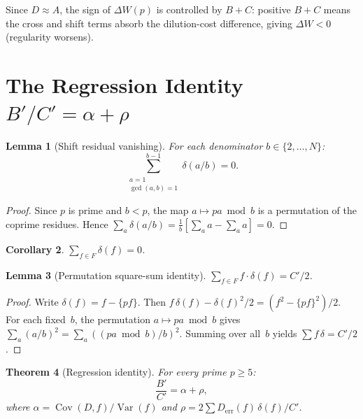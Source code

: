 \documentclass[11pt]{article}
\newtheorem{theorem}{Theorem}[section]
\newtheorem{lemma}[theorem]{Lemma}
\newtheorem{corollary}[theorem]{Corollary}
\theoremstyle{definition}
\DeclareMathOperator{\Cov}{Cov}
\DeclareMathOperator{\Var}{Var}
\begin{document}
Since $D \approx A$, the sign of $\Delta W(p)$ is controlled by
$B + C$: positive $B + C$ means the cross and shift terms absorb
the dilution-cost difference, giving $\Delta W < 0$ (regularity
worsens).



\section{The Regression Identity $B'/C' = \alpha + \rho$}
\label{sec:regression}

\begin{lemma}[Shift residual vanishing]\label{lem:shift-vanish}
For each denominator $b \in \{2, \ldots, N\}$:
\[
  \sum_{\substack{a=1 \\ \gcd(a,b)=1}}^{b-1} \delta(a/b) = 0.
\]
\end{lemma}

\begin{proof}
Since $p$ is prime and $b < p$, the map $a \mapsto pa \bmod b$ is a
permutation of the coprime residues.  Hence
$\sum_a \delta(a/b) = \frac{1}{b}[\sum_a a - \sum_a a] = 0$.
\end{proof}

\begin{corollary}\label{cor:sum-delta-zero}
$\sum_{f \in F} \delta(f) = 0$.
\end{corollary}

\begin{lemma}[Permutation square-sum identity]\label{lem:perm-sq}
$\sum_{f \in F} f \cdot \delta(f) = C'/2$.
\end{lemma}

\begin{proof}
Write $\delta(f) = f - \{pf\}$.  Then
$f\,\delta(f) - \delta(f)^2/2 = (f^2 - \{pf\}^2)/2$.
For each fixed~$b$, the permutation $a \mapsto pa \bmod b$ gives
$\sum_a (a/b)^2 = \sum_a ((pa \bmod b)/b)^2$.  Summing over all~$b$
yields $\sum f\,\delta = C'/2$.
\end{proof}

\begin{theorem}[Regression identity]\label{thm:regression}
For every prime $p \ge 5$:
\begin{equation}\label{eq:regression}
  \frac{B'}{C'} = \alpha + \rho,
\end{equation}
where $\alpha = \Cov(D,f)/\Var(f)$ and
$\rho = 2\sum D_{\mathrm{err}}(f)\,\delta(f)/C'$.
\end{theorem}
\end{document}
